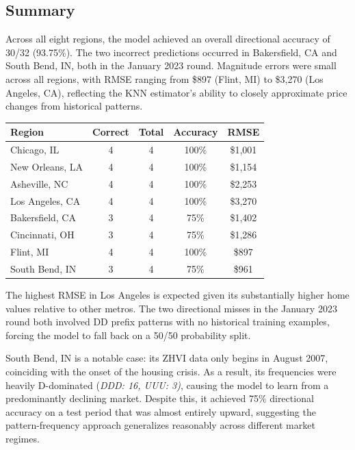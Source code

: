 \documentclass{article}
\begin{document}
\subsection{Summary} 
Across all eight regions, the model achieved an overall directional accuracy of 30/32 (93.75\%). The two incorrect predictions occurred in Bakersfield, CA and South Bend, IN, both in the January 2023 round. Magnitude errors were small across all regions, with RMSE ranging from \$897 (Flint, MI) to \$3,270 (Los Angeles, CA), reflecting the KNN estimator's ability to closely approximate price changes from historical patterns. 
\begin{center}
\begin{tabular}{lcccc}
\hline
\textbf{Region} & \textbf{Correct} & \textbf{Total} & \textbf{Accuracy} & \textbf{RMSE} \\ \hline
Chicago, IL & 4 & 4 & 100\% & \$1,001 \\
New Orleans, LA & 4 & 4 & 100\% & \$1,154 \\
Asheville, NC & 4 & 4 & 100\% & \$2,253 \\
Los Angeles, CA & 4 & 4 & 100\% & \$3,270 \\
Bakersfield, CA & 3 & 4 & 75\% & \$1,402 \\
Cincinnati, OH & 3 & 4 & 75\% & \$1,286 \\
Flint, MI & 4 & 4 & 100\% & \$897 \\
South Bend, IN & 3 & 4 & 75\% & \$961 \\ \hline
\end{tabular}
\end{center}
The highest RMSE in Los Angeles is expected given its substantially higher home values relative to other metros. The two directional misses in the January 2023 round both involved DD prefix patterns with no historical training examples, forcing the model to fall back on a 50/50 probability split. 

South Bend, IN is a notable case: its ZHVI data only begins in August 2007, coinciding with the onset of the housing crisis. As a result, its frequencies were heavily D-dominated (\textit{DDD: 16, UUU: 3)}, causing the model to learn from a predominantly declining market. Despite this, it achieved 75\% directional accuracy on a test period that was almost entirely upward, suggesting the pattern-frequency approach generalizes reasonably across different market regimes. 
\end{document}
